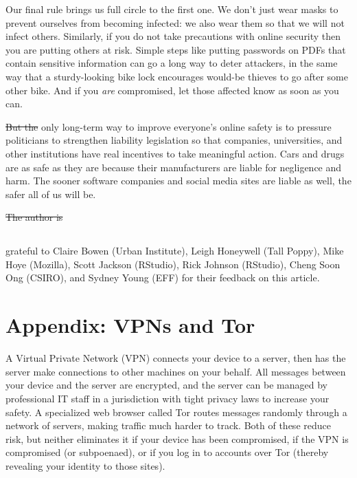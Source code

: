 \documentclass[10pt,letterpaper]{article}
\providecommand{\DIFadd}[1]{{\protect\color{blue}\uwave{#1}}} %
\providecommand{\DIFdel}[1]{{\protect\color{red}\sout{#1}}}                      %
\providecommand{\DIFaddbegin}{} %
\providecommand{\DIFaddend}{} %
\providecommand{\DIFdelbegin}{} %
\providecommand{\DIFdelend}{} %
\begin{document}
Our final rule brings us full circle to the first one. We don't just wear masks
to prevent ourselves from becoming infected: we also wear them so that we will
not infect others. Similarly, if you do not take precautions with online
security then you are putting others at risk.  Simple steps like putting
passwords on PDFs that contain sensitive information can go a long way to deter
attackers, in the same way that a sturdy-looking bike lock encourages would-be
thieves to go after some other bike. And if you \emph{are} compromised, let
those affected know as soon as you can.

\DIFdelbegin \DIFdel{But the }\DIFdelend \DIFaddbegin \DIFadd{The }\DIFaddend only long-term way to improve everyone's online safety is to pressure
politicians to strengthen liability legislation so that companies, universities,
and other institutions have real incentives to take meaningful action. Cars and
drugs are as safe as they are because their manufacturers are liable for
negligence and harm. The sooner software companies and social media sites are
liable as well, the safer all of us will be.

\DIFdelbegin %
\DIFdel{The author is }\DIFdelend \DIFaddbegin \subsection*{\DIFadd{Acknowledgments}}

\DIFadd{The authors are }\DIFaddend grateful to Claire Bowen (Urban Institute), Leigh Honeywell
(Tall Poppy), Mike Hoye (Mozilla), Scott Jackson (RStudio), Rick Johnson
(RStudio), Cheng Soon Ong (CSIRO), and Sydney Young (EFF) for their feedback on
this article.
\DIFdelbegin %
\DIFdelend 



\section*{Appendix: VPNs and Tor}

A Virtual Private Network (VPN) connects your device to a server, then has the
server make connections to other machines on your behalf. All messages between
your device and the server are encrypted, and the server can be managed by
professional IT staff in a jurisdiction with tight privacy laws to increase your
safety. A specialized web browser called Tor routes messages randomly through a
network of servers, making traffic much harder to track. Both of these reduce
risk, but neither eliminates it if your device has been compromised, if the VPN
is compromised (or subpoenaed), or if you log in to accounts over Tor (thereby
revealing your identity to those sites).
\end{document}
